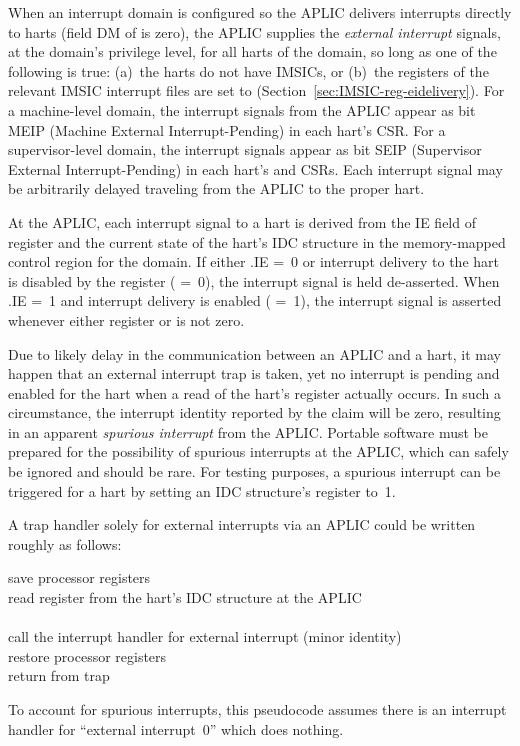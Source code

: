 When an interrupt domain is configured so the APLIC delivers interrupts
directly to harts (field DM of  is zero), the APLIC
supplies the \emph{external interrupt} signals, at the domain's
privilege level, for all harts of the domain, so long as one of the
following is true:
(a)~the harts do not have IMSICs, or
(b)~the  registers of the relevant IMSIC interrupt files
are set to  (Section~\ref{sec:IMSIC-reg-eidelivery}).
For a machine-level domain, the interrupt signals from the APLIC appear
as bit MEIP (Machine External Interrupt-Pending) in each hart's 
CSR.
For a supervisor-level domain, the interrupt signals appear as bit
SEIP (Supervisor External Interrupt-Pending) in each hart's  and
 CSRs.
Each interrupt signal may be arbitrarily delayed traveling from the
APLIC to the proper hart.

At the APLIC, each interrupt signal to a hart is derived from the IE
field of register  and the current state of the hart's IDC
structure in the memory-mapped control region for the domain.
If either .IE =~0 or interrupt delivery to the hart
is disabled by the  register ( =~0), the
interrupt signal is held de-asserted.
When .IE =~1 and interrupt delivery is enabled
( =~1), the interrupt signal is asserted whenever either
register  or  is not zero.

Due to likely delay in the communication between an APLIC and a hart, it
may happen that an external interrupt trap is taken, yet no interrupt
is pending and enabled for the hart when a read of the hart's
 register actually occurs.
In such a circumstance, the interrupt identity reported by the claim
will be zero, resulting in an apparent \emph{spurious interrupt} from
the APLIC.
Portable software must be prepared for the possibility of spurious
interrupts at the APLIC, which can safely be ignored and should be rare.
For testing purposes, a spurious interrupt can be triggered for a hart
by setting an IDC structure's  register to~1.

A trap handler solely for external interrupts via an APLIC
could be written roughly as follows:

\begin{displayLinesTable}
save processor registers \\
read register  from the hart's IDC structure at the APLIC \\
 \\
call the interrupt handler for external interrupt  (minor identity) \\
restore processor registers \\
return from trap \\
\end{displayLinesTable}
To account for spurious interrupts, this pseudocode assumes there is an
interrupt handler for ``external interrupt~0'' which does nothing.

